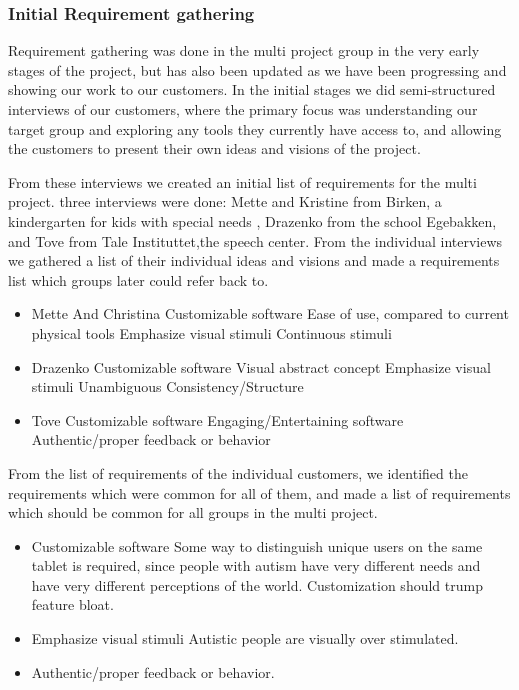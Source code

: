 \subsubsection*{Initial Requirement gathering}
Requirement gathering was done in the multi project group in the very early stages of the project, but has also been updated as we have been progressing and showing our work to our customers.
In the initial stages we did semi-structured interviews of our customers, where the primary focus was understanding our target group and exploring any tools they currently have access to, and allowing the customers to present their own ideas and visions of the project.

From these interviews we created an initial list of requirements for the multi project.
three interviews were done: Mette and Kristine from Birken, a kindergarten for kids with special needs , Drazenko from the school Egebakken, and Tove from Tale Instituttet,the speech center.
From the individual interviews we gathered a list of their individual ideas and visions and made a requirements list which groups later could refer back to.

\begin{itemize}
 \item Mette And Christina 
  \subitem Customizable software
  \subitem Ease of use, compared to current physical tools
  \subitem Emphasize visual stimuli
  \subitem Continuous stimuli 
 \item Drazenko
  \subitem Customizable software
  \subitem Visual abstract concept
  \subitem Emphasize visual stimuli
  \subitem Unambiguous
  \subitem Consistency/Structure
 \item Tove 
  \subitem Customizable software
  \subitem Engaging/Entertaining software
  \subitem Authentic/proper feedback or behavior
\end{itemize}

From the list of requirements of the individual customers, we identified the requirements which were common for all of them, and made a list of requirements which
should be common for all groups in the multi project.

\begin{itemize}
 \item Customizable software
  \subitem Some way to distinguish unique users on the same tablet is required, since people with autism have very different needs and have very different perceptions of the world.
  \subitem Customization should trump feature bloat.
 \item Emphasize visual stimuli
  \subitem Autistic people are visually over stimulated.
 \item Authentic/proper feedback or behavior.
\end{itemize}

